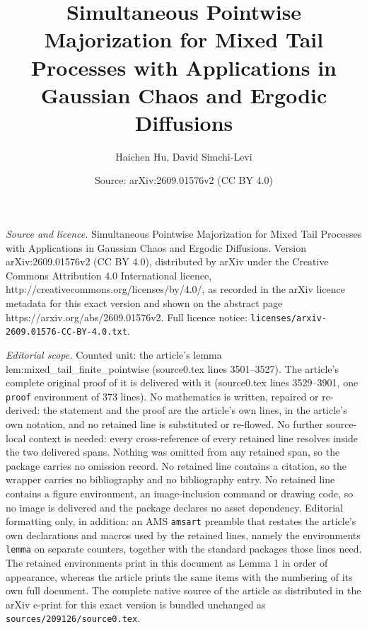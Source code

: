 \documentclass[10pt,a4paper]{amsart}
\title{\normalfont Simultaneous Pointwise Majorization for Mixed Tail Processes with Applications in Gaussian Chaos and Ergodic Diffusions}
\author{Haichen Hu, David Simchi-Levi}
\date{Source: arXiv:2609.01576v2 (CC BY 4.0)}
\begin{document}
\maketitle

\noindent\emph{Source and licence.} \normalfont Simultaneous Pointwise Majorization for Mixed Tail Processes with Applications in Gaussian Chaos and Ergodic Diffusions. Version arXiv:2609.01576v2 (CC BY 4.0), distributed by arXiv under the Creative Commons Attribution 4.0 International licence, http://creativecommons.org/licenses/by/4.0/, as recorded in the arXiv licence metadata for this exact version and shown on the abstract page https://arxiv.org/abs/2609.01576v2. Full licence notice: \texttt{licenses/arxiv-2609.01576-CC-BY-4.0.txt}.\par\smallskip

\noindent\textit{Editorial scope.} Counted unit: the article's lemma lem:mixed\_tail\_finite\_pointwise (source0.tex lines 3501--3527). The article's complete original proof of it is delivered with it (source0.tex lines 3529--3901, one \texttt{proof} environment of 373 lines). No mathematics is written, repaired or re-derived: the statement and the proof are the article's own lines, in the article's own notation, and no retained line is substituted or re-flowed.  No further source-local context is needed: every cross-reference of every retained line resolves inside the two delivered spans.  Nothing was omitted from any retained span, so the package carries no omission record.  No retained line contains a citation, so the wrapper carries no bibliography and no bibliography entry.  No retained line contains a figure environment, an image-inclusion command or drawing code, so no image is delivered and the package declares no asset dependency.  Editorial formatting only, in addition: an AMS \texttt{amsart} preamble that restates the article's own declarations and macros used by the retained lines, namely the environments \texttt{lemma} on separate counters, together with the standard packages those lines need.  The retained environments print in this document as Lemma 1 in order of appearance, whereas the article prints the same items with the numbering of its own full document.  The complete native source of the article as distributed in the arXiv e-print for this exact version is bundled unchanged as \texttt{sources/209126/source0.tex}.
\end{document}
